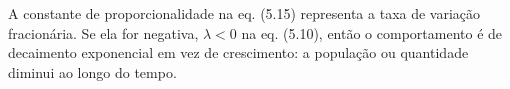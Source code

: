 A constante de proporcionalidade na eq. (5.15) representa a taxa de variação fracionária. Se ela for negativa, $\lambda<0$ na eq. (5.10), então o comportamento é de decaimento exponencial em vez de crescimento: a população ou quantidade diminui ao longo do tempo. 